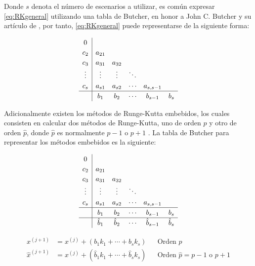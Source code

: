         Donde $s$ denota el número de escenarios a utilizar, es común expresar \cref{eq:RKgeneral} utilizando una tabla de Butcher, en honor a John C. Butcher y su artículo de \citeyear{butcher1964runge}, por tanto, \cref{eq:RKgeneral} puede representarse de la siguiente forma:

        \begin{equation}\label{eq:explicitoButcher}
            \renewcommand\arraystretch{1.2}
            \begin{array}{c|ccccc}
            0\\
            c_2 & a_{21}\\
            c_3 & a_{31} & a_{32}\\
            \vdots & \vdots & \vdots & \ddots\\
            c_s & a_{s1} & a_{s2} & \cdots & a_{s,s-1}\\
            \hline
            & b_1 & b_2 & \cdots & b_{s-1} &  b_{s}
            \end{array}
        \end{equation}

        Adicionalmente existen los métodos de Runge-Kutta embebidos, los cuales consisten en calcular dos métodos de Runge-Kutta, uno de orden $p$ y otro de orden $\hat{p}$, donde $\hat{p}$ es normalmente $p-1$ o $p+1$ \Parencite{hairer1991solving}. La tabla de Butcher para representar los métodos embebidos es la siguiente:
        
        \pagebreak

        \begin{equation}\label{eq:embebidoButcher}
            \renewcommand\arraystretch{1.2}
            \begin{array}{c|ccccc}
            0\\
            c_2 & a_{21}\\
            c_3 & a_{31} & a_{32}\\
            \vdots & \vdots & \vdots & \ddots\\
            c_s & a_{s1} & a_{s2} & \cdots & a_{s,s-1}\\
            \hline
            & b_1 & b_2 & \cdots & b_{s-1} &  b_{s}\\
            \hline
            & \hat{b}_1 & \hat{b}_2 & \cdots & \hat{b}_{s-1} &  \hat{b}_{s}
            \end{array}
        \end{equation}

        \begin{align}
            x^{(j+1)} &= x^{(j)} + (b_1 k_1 + \cdots + b_s k_s) & &\text{Orden $p$}\\
            \hat{x}^{(j+1)} &= x^{(j)} + (\hat{b}_1 k_1 + \cdots +\hat{b}_s k_s) & &\text{Orden $\hat{p} = p-1$ o $p+1$}
        \end{align}

